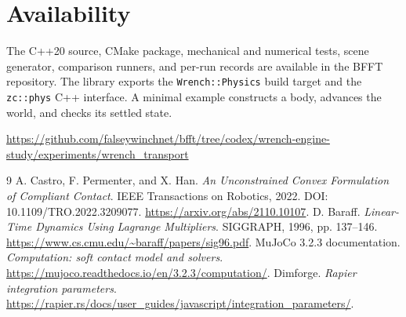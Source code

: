 \documentclass[10pt,letterpaper]{article}
\begin{document}
\section{Availability}
The C++20 source, CMake package, mechanical and numerical tests, scene generator, comparison runners, and per-run records are available in the BFFT repository. The library exports the \texttt{Wrench::Physics} build target and the \texttt{zc::phys} C++ interface. A minimal example constructs a body, advances the world, and checks its settled state.
\begin{center}\small
\url{https://github.com/falseywinchnet/bfft/tree/codex/wrench-engine-study/experiments/wrench_transport}
\end{center}

\begin{thebibliography}{9}\small
{} A. Castro, F. Permenter, and X. Han. \emph{An Unconstrained Convex Formulation of Compliant Contact}. IEEE Transactions on Robotics, 2022. DOI: 10.1109/TRO.2022.3209077. \url{https://arxiv.org/abs/2110.10107}.
 D. Baraff. \emph{Linear-Time Dynamics Using Lagrange Multipliers}. SIGGRAPH, 1996, pp. 137--146. \url{https://www.cs.cmu.edu/~baraff/papers/sig96.pdf}.
 MuJoCo 3.2.3 documentation. \emph{Computation: soft contact model and solvers}. \url{https://mujoco.readthedocs.io/en/3.2.3/computation/}.
 Dimforge. \emph{Rapier integration parameters}. \url{https://rapier.rs/docs/user_guides/javascript/integration_parameters/}.
\end{thebibliography}
\end{document}
